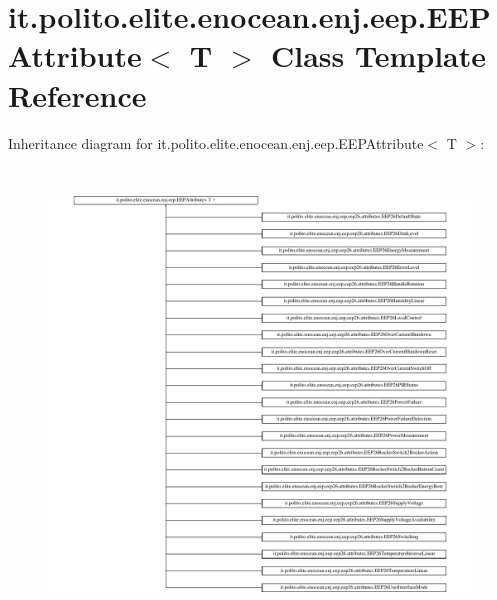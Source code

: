 \hypertarget{classit_1_1polito_1_1elite_1_1enocean_1_1enj_1_1eep_1_1_e_e_p_attribute}{}\section{it.\+polito.\+elite.\+enocean.\+enj.\+eep.\+E\+E\+P\+Attribute$<$ T $>$ Class Template Reference}
\label{classit_1_1polito_1_1elite_1_1enocean_1_1enj_1_1eep_1_1_e_e_p_attribute}
Inheritance diagram for it.\+polito.\+elite.\+enocean.\+enj.\+eep.\+E\+E\+P\+Attribute$<$ T $>$\+:\begin{figure}[H]
\begin{center}
\leavevmode
\includegraphics[height=12.000000cm]{classit_1_1polito_1_1elite_1_1enocean_1_1enj_1_1eep_1_1_e_e_p_attribute}
\end{center}
\end{figure}
